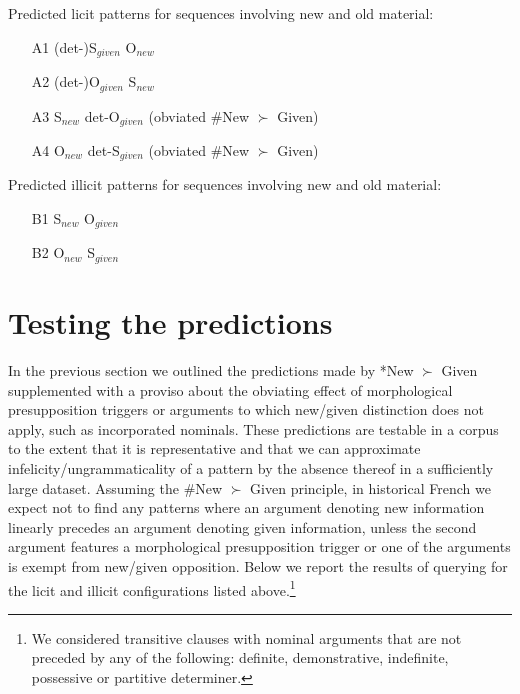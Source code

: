 \documentclass[output=paper,modfonts,nonflat]{langsci/langscibook}
\begin{document}
\ea
Predicted licit patterns for sequences involving new and old material: \label{licit}\\
\z
\begin{itemize}
\setlength\itemsep{-0.5em}
\item[A1] ({\sc det}-)S$_{given}$ O$_{new}$
\item[A2] ({\sc det}-)O$_{given}$ S$_{new}$
\item[A3] S$_{new}$ {\sc det}-O$_{given}$ \hfill (obviated \#New $\succ$ Given)
\item[A4] O$_{new}$ {\sc det}-S$_{given}$ \hfill (obviated \#New $\succ$ Given)
\end{itemize}

\ea
Predicted illicit patterns for sequences involving new and old material: \label{illicit}\\
\z
\begin{itemize}
\setlength\itemsep{-0.5em}
\item[B1] S$_{new}$ O$_{given}$
\item[B2] O$_{new}$ S$_{given}$
\end{itemize}


\section{Testing the predictions}
\label{section:predictions}

In the previous section we outlined the predictions made by *New $\succ$ Given supplemented with a proviso about the obviating effect of morphological presupposition triggers or arguments to which new/given distinction does not apply, such as incorporated nominals. These predictions are testable in a corpus to the extent that it is representative and that we can approximate infelicity/ungrammaticality of a pattern by the absence thereof in a sufficiently large dataset. Assuming the \#New $\succ$ Given principle, in historical French we expect not to find any patterns where an argument denoting new information linearly precedes an argument denoting given information, unless the second argument features a morphological presupposition trigger or one of the arguments is exempt from new/given opposition. Below we report the results of querying for the licit and illicit configurations listed above.\footnote{We considered transitive clauses with nominal arguments that are not preceded by any of the following: definite, demonstrative, indefinite, possessive or partitive determiner.}
\end{document}
